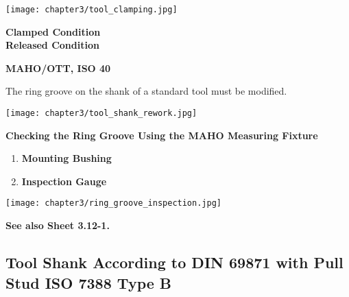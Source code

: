 \vspace{0.5cm}

\begin{minipage}{0.6\textwidth}
    \centering
    \texttt{[image: chapter3/tool\_clamping.jpg]}
\end{minipage}%
\begin{minipage}{0.4\textwidth}
   \textbf{Clamped Condition}
    \vspace{3.2cm}\\
   \textbf{Released Condition}
\end{minipage}


\textbf{MAHO/OTT, ISO 40}

\vspace{.5cm}

The ring groove on the shank of a standard tool must be modified.

\vspace{0.5cm}

\begin{minipage}{\textwidth}
    \centering
    \texttt{[image: chapter3/tool\_shank\_rework.jpg]}
\end{minipage}

\vspace{0.5cm}

\textbf{Checking the Ring Groove Using the MAHO Measuring Fixture}

\begin{enumerate}[itemsep=1pt,parsep=0pt]
    \item \textbf{Mounting Bushing}
    \item \textbf{Inspection Gauge}
\end{enumerate}

\vspace{0.5cm}

\begin{minipage}{\textwidth}
    \centering
    \texttt{[image: chapter3/ring\_groove\_inspection.jpg]}
\end{minipage}

\vspace{0.5cm}

\textbf{See also Sheet 3.12-1.}

\newpage

\subsection{Tool Shank According to DIN 69871 with Pull Stud ISO 7388 Type B}

